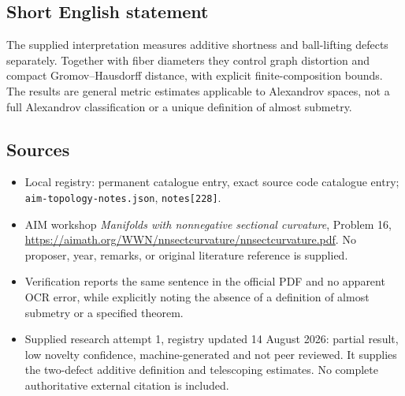 \documentclass[11pt]{article}
\begin{document}
\subsection{Short English statement}
The supplied interpretation measures additive shortness and ball-lifting defects separately. Together with fiber diameters they control graph distortion and compact Gromov--Hausdorff distance, with explicit finite-composition bounds. The results are general metric estimates applicable to Alexandrov spaces, not a full Alexandrov classification or a unique definition of almost submetry.
\subsection{Sources}
\begin{itemize}
\item Local registry: permanent catalogue entry, exact source code catalogue entry; \texttt{aim-topology-notes.json}, \texttt{notes[228]}.
\item AIM workshop \emph{Manifolds with nonnegative sectional curvature}, Problem 16, \url{https://aimath.org/WWN/nnsectcurvature/nnsectcurvature.pdf}. No proposer, year, remarks, or original literature reference is supplied.
\item Verification reports the same sentence in the official PDF and no apparent OCR error, while explicitly noting the absence of a definition of almost submetry or a specified theorem.
\item Supplied research attempt 1, registry updated 14 August 2026: partial result, low novelty confidence, machine-generated and not peer reviewed. It supplies the two-defect additive definition and telescoping estimates. No complete authoritative external citation is included.
\end{itemize}
\end{document}
